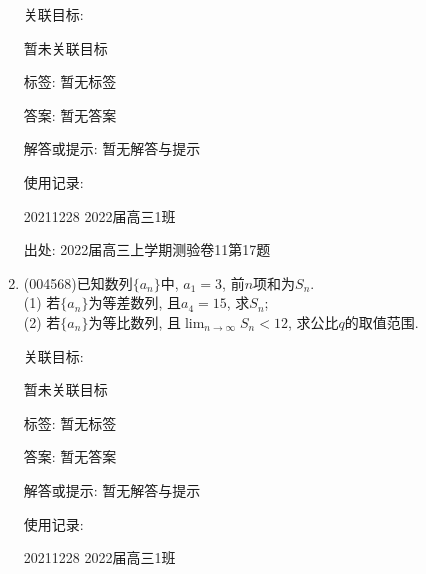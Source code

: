 \documentclass[10pt,a4paper]{article}
\begin{document}
\begin{enumerate}[1.]
关联目标:

暂未关联目标



标签: 暂无标签

答案: 暂无答案

解答或提示: 暂无解答与提示

使用记录:

20211228	2022届高三1班		


出处: 2022届高三上学期测验卷11第17题
\item { (004568)}已知数列$\{a_n\}$中, $a_1=3$, 前$n$项和为$S_n$.\\
(1) 若$\{a_n\}$为等差数列, 且$a_4=15$, 求$S_n$;\\
(2) 若$\{a_n\}$为等比数列, 且$\displaystyle\lim_{n\to \infty}S_n<12$, 求公比$q$的取值范围.


关联目标:

暂未关联目标



标签: 暂无标签

答案: 暂无答案

解答或提示: 暂无解答与提示

使用记录:

20211228	2022届高三1班		



\end{enumerate}
\end{document}
